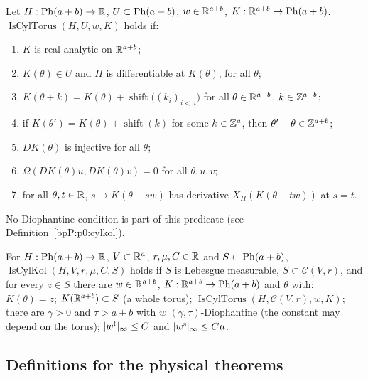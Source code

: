 \begin{definition}\label{bpP:p0:cyltorus}
Let $H:\mathrm{Ph}(a+b)\to\mathbb{R}$, $U\subset\mathrm{Ph}(a+b)$, $w\in\mathbb{R}^{a+b}$, $K:\mathbb{R}^{a+b}\to\mathrm{Ph}(a+b)$. $\operatorname{IsCylTorus}(H,U,w,K)$
holds if:
\begin{enumerate}[label=(\roman*)]
\item $K$ is real analytic on $\mathbb{R}^{a+b}$;
\item $K(\theta)\in U$ and $H$ is differentiable at $K(\theta)$, for all $\theta$;
\item $K(\theta+k)=K(\theta)+\operatorname{shift}\bigl((k_i)_{i<a}\bigr)$ for all $\theta\in\mathbb{R}^{a+b}$, $k\in\mathbb{Z}^{a+b}$;
\item if $K(\theta')=K(\theta)+\operatorname{shift}(k)$ for some $k\in\mathbb{Z}^a$, then $\theta'-\theta\in\mathbb{Z}^{a+b}$;
\item $DK(\theta)$ is injective for all $\theta$;
\item $\Omega(DK(\theta)u,DK(\theta)v)=0$ for all $\theta,u,v$;
\item for all $\theta,t\in\mathbb{R}$, $s\mapsto K(\theta+sw)$ has derivative $X_H(K(\theta+tw))$ at $s=t$.
\end{enumerate}
No Diophantine condition is part of this predicate (see Definition~\ref{bpP:p0:cylkol}).
\end{definition}

\begin{definition}\label{bpP:p0:cylkol}
For $H:\mathrm{Ph}(a+b)\to\mathbb{R}$, $V\subset\mathbb{R}^a$, $r,\mu,C\in\mathbb{R}$ and $S\subset\mathrm{Ph}(a+b)$,
$\operatorname{IsCylKol}(H,V,r,\mu,C,S)$ holds if $S$ is Lebesgue measurable, $S\subset\mathcal C(V,r)$, and for every $z\in S$ there
are $w\in\mathbb{R}^{a+b}$, $K:\mathbb{R}^{a+b}\to\mathrm{Ph}(a+b)$ and $\theta$ with: $K(\theta)=z$; $K(\mathbb{R}^{a+b})\subset S$ (a whole torus);
$\operatorname{IsCylTorus}(H,\mathcal C(V,r),w,K)$; there are $\gamma>0$ and $\tau>a+b$ with $w$ $(\gamma,\tau)$-Diophantine
(the constant may depend on the torus); $\lvert w^{\rm f}\rvert_\infty\le C$ and $\lvert w^{\rm s}\rvert_\infty\le C\mu$.
\end{definition}

\subsection{Definitions for the physical theorems}\label{bpP:p0:physdefs}

